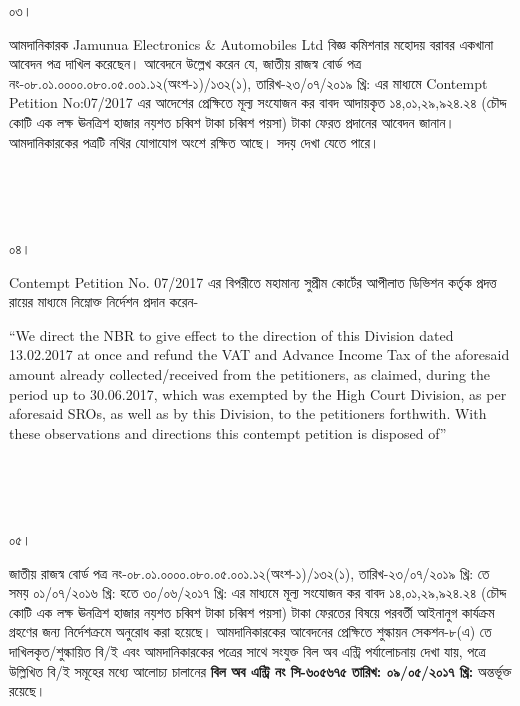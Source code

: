 \documentclass[12pt]{article}
\newcommand{\nbrl}{নং-০৮.০১.০০০০.০৮০.০৫.০০১.১২(অংশ-১)/১৩২(১), তারিখ-২৩/০৭/২০১৯ খ্রি:}
\newcommand{\tvat}{১৪,০১,২৯,৯২৪.২৪ (চৌদ্দ কোটি এক লক্ষ ঊনত্রিশ হাজার নয়শত চব্বিশ টাকা চব্বিশ পয়সা) টাকা}
\newcommand{\tl}{০১/০৭/২০১৬ খ্রি: হতে ৩০/০৬/২০১৭ খ্রি:}
\newcommand{\cno}{৬০৫৬৭৫}
\newcommand{\dt}{০৯/০৫/২০১৭}
\begin{document}
\begin{minipage}[t]{0.05\linewidth}
০৩।
\end{minipage}
\begin{minipage}[t]{1\linewidth}
আমদানিকারক
Jamunua Electronics \& Automobiles Ltd
বিজ্ঞ কমিশনার মহোদয় বরাবর
একখানা আবেদন পত্র দাখিল
করেছেন। আবেদনে উল্লেখ করেন যে,
জাতীয় রাজস্ব বোর্ড পত্র
{\nbrl} এর মাধ্যমে
Contempt Petition No:07/2017
এর আদেশের প্রেক্ষিতে মূল্য সংযোজন কর
বাবদ আদায়কৃত
{\tvat} ফেরত প্রদানের আবেদন জানান।
আমদানিকারকের পত্রটি নথির যোগাযোগ
অংশে রক্ষিত আছে।
সদয় দেখা যেতে পারে।
\end{minipage}
\\
\\
\\
\begin{minipage}[t]{0.05\linewidth}
০৪।
\end{minipage}
\begin{minipage}[t]{1\linewidth}
Contempt Petition No. 07/2017
এর বিপরীতে মহামান্য সুপ্রীম কোর্টের
আপীলাত ডিভিশন কর্তৃক প্রদত্ত রায়ের
মাধ্যমে নিম্নোক্ত নির্দেশন প্রদান করেন-


\hspace{1em}``We direct the NBR
to give effect to the direction
of this Division
dated 13.02.2017
at once and refund the VAT
and Advance Income Tax
of the aforesaid amount already
collected/received from the
petitioners, as claimed, during
the period up to 30.06.2017,
which was exempted by the
High Court Division, as per
aforesaid SROs, as well as by this
Division, to the  petitioners
forthwith. With these observations
and directions this contempt
petition is disposed of''
\end{minipage}
\\
\\
\\
\begin{minipage}[t]{0.05\linewidth}
০৫।
\end{minipage}
\begin{minipage}[t]{1\linewidth}
জাতীয় রাজস্ব বোর্ড পত্র
{\nbrl} তে সময়
{\tl} এর মাধ্যমে মূল্য সংযোজন কর বাবদ
{\tvat} ফেরতের বিষয়ে পরবর্তী
আইনানুগ কার্যক্রম গ্রহণের জন্য
নির্দেশক্রমে অনুরোধ করা হয়েছে।
আমদানিকারকের আবেদনের প্রেক্ষিতে শুল্কায়ন
সেকশন-৮(এ) তে দাখিলকৃত/শুল্কায়িত
বি/ই এবং আমদানিকারকের
পত্রের সাথে সংযুক্ত বিল অব এন্ট্রি
পর্যালোচনায় দেখা যায়,
পত্রে উল্লিখিত বি/ই সমূহের
মধ্যে আলোচ্য চালানের
\textbf{বিল অব এন্ট্রি নং সি-{\cno} তারিখ: {\dt} খ্রি:} অন্তর্ভূক্ত রয়েছে।
\end{minipage}
\end{document}
